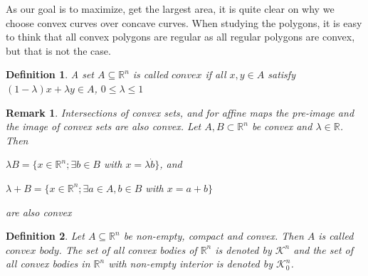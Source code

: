 \documentclass[a4paper]{book}
\newtheorem{remark}{Remark}%
\newtheorem{definition}{Definition}%
\begin{document}
As our goal is to maximize, get the largest area, it is quite clear on why we choose convex curves over concave curves. When studying the polygons, it is easy to think that all convex polygons are regular as all regular polygons are convex, but that is not the case.
\newline

\begin{definition}
	A set $A\subseteq\mathbb{R}^n$ is called $convex$ if all $x,y\in A$ satisfy $(1-\lambda)x+\lambda y\in A$, $0\leq\lambda\leq1$
\end{definition}

\begin{remark}
	Intersections of convex sets, and for affine maps the pre-image and the image of convex sets are also convex. Let $A, B \subset\mathbb{R}^n$ be convex and $\lambda\in\mathbb{R}$. Then
	\begin{center}
		$\lambda B=\{x\in\mathbb{R}^n;\exists b\in B$ with $x=\lambda\dot b\}$, and
	
		$\lambda+B=\{x\in\mathbb{R}^n;\exists a\in A, b\in B$ with $x=a+b\}$
	\end{center}
	are also convex
\end{remark}

\begin{definition}
	Let $A\subseteq\mathbb{R}^n$ be non-empty, compact and convex. Then $A$ is called $convex$ $body$. The set of all convex bodies of $\mathbb{R}^n$ is denoted by $\mathscr{K}^n$ and the set of all convex bodies in $\mathbb{R}^n$ with non-empty interior is denoted by $\mathscr{K}_{0}^{n}$.
\end{definition}
\end{document}
